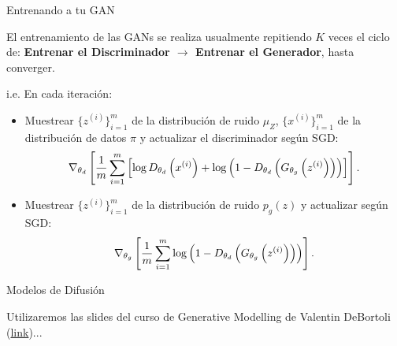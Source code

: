 \documentclass[aspectratio=169,xcolor=dvipsnames, t, spanish]{beamer}
\begin{document}
\begin{frame}{Entrenando a tu GAN}\vspace{-6mm}
\begin{center}
    El entrenamiento de las GANs se realiza usualmente repitiendo $K$ veces el ciclo de: \textbf{Entrenar el Discriminador $\rightarrow$ Entrenar el Generador}, hasta converger.
\end{center}
\pause

    i.e. En cada iteración:
    \begin{itemize}
        \item Muestrear $\{z^{(i)}\}_{i=1}^m$ de la distribución de ruido $\mu_Z$, $\{x^{(i)}\}_{i=1}^m$ de la distribución de datos $\pi$ y actualizar el discriminador según SGD:\vspace{-1mm}
            \[
                \nabla_{\theta_d} \left[ \frac{1}{m} \sum_{i=1}^m \left[ \log D_{\theta_d}\left(x^{(i)}\right) + \log \left(1 - D_{\theta_d}\left(G_{\theta_g}\left(z^{(i)}\right)\right)\right) \right] \right].\vspace{-1mm}
            \]
        \pause
        \item Muestrear $\{z^{(i)}\}_{i=1}^m$ de la distribución de ruido $p_g(z)$ y actualizar según SGD:\vspace{-1mm}
        \[
            \nabla_{\theta_g} \left[\frac{1}{m} \sum_{i=1}^m \log \left(1 - D_{\theta_d}\left(G_{\theta_g}\left(z^{(i)}\right)\right)\right)\right].\vspace{-1mm}
        \]
    \end{itemize}
\end{frame}



\begin{frame}{Modelos de Difusión}

    \begin{center}
        Utilizaremos las slides del curso de Generative Modelling de Valentin DeBortoli (\href{https://vdeborto.github.io/project/generative_modeling/}{link})... 
    \end{center}
    
\end{frame}
\end{document}
